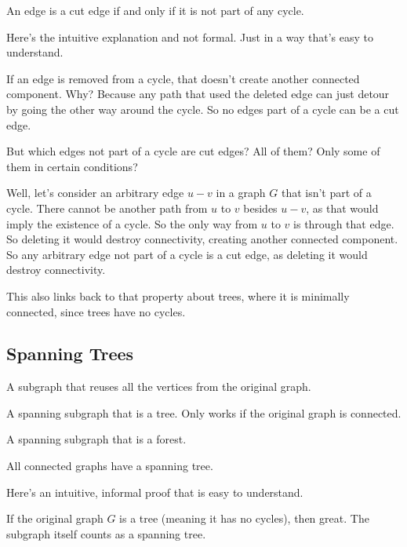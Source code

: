 \documentclass[11pt]{scrartcl}
\begin{document}
\begin{lemma}
An edge is a cut edge if and only if it is not part of any cycle.
\end{lemma}
Here's the intuitive explanation and not formal. Just in a way that's easy to understand.

If an edge is removed from a cycle, that doesn't create another connected component. Why? Because any path that used the deleted edge can just detour by going the other way around the cycle. So no edges part of a cycle can be a cut edge.

But which edges not part of a cycle are cut edges? All of them? Only some of them in certain conditions?

Well, let's consider an arbitrary edge $u - v$ in a graph $G$ that isn't part of a cycle. There cannot be another path from $u$ to $v$ besides $u - v$, as that would imply the existence of a cycle. So the only way from $u$ to $v$ is through that edge. So deleting it would destroy connectivity, creating another connected component. So any arbitrary edge not part of a cycle is a cut edge, as deleting it would destroy connectivity.

This also links back to that property about trees, where it is minimally connected, since trees have no cycles.

\subsection{Spanning Trees}

\begin{definition}
A subgraph that reuses all the vertices from the original graph.
\end{definition}

\begin{definition}
A spanning subgraph that is a tree. Only works if the original graph is connected.
\end{definition}

\begin{definition}
A spanning subgraph that is a forest.
\end{definition}

\begin{lemma}
All connected graphs have a spanning tree.
\end{lemma}
Here's an intuitive, informal proof that is easy to understand.

If the original graph $G$ is a tree (meaning it has no cycles), then great. The subgraph itself counts as a spanning tree.
\end{document}
